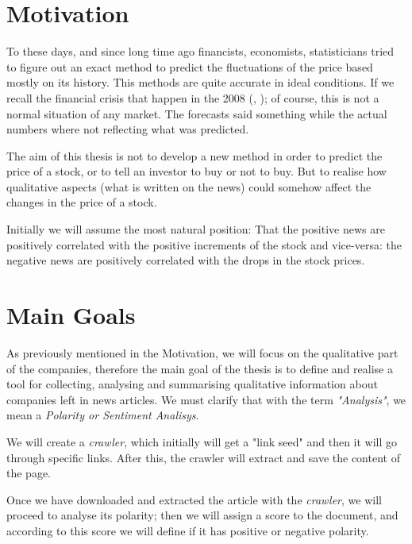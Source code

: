 	\section{Motivation}
	
	To these days, and since long time ago financists, economists, statisticians tried to figure out an exact method 
	to predict the fluctuations of the price based mostly on its history. This methods are quite accurate in ideal
	conditions. If we recall the financial crisis that happen in the 2008 (\cite{P2009}, \cite{R2010}); of course, this is not a normal situation of any 
	market. The forecasts said something while the actual numbers where not reflecting what was predicted. 
	
	The aim of this thesis is not to develop a new method in order to predict the price of a stock, or to tell an investor to buy
	or not to buy. But to realise how qualitative aspects (what is written on the news) could somehow affect the changes in the price of a stock.
	
	Initially we will assume the most natural position: That the positive news are positively correlated with the 
	positive increments of the stock and vice-versa: the negative news are positively correlated with the drops
	in the stock prices.
	
	\clearpage
	\section{Main Goals}
	
	As previously mentioned in the Motivation, we will focus on the qualitative part of the companies, therefore the main goal of the thesis is to define and realise a tool for collecting, analysing and summarising qualitative information about companies left in news articles. 
	We must clarify that with the term \emph{"Analysis"}, we mean a \emph{Polarity or Sentiment Analisys}.
	
	We will create a \emph{crawler}, which initially will get a "link seed" and then it will go through specific links. After this, the crawler will extract and save the content of the page.
	
	Once we have downloaded and extracted the article with the \emph{crawler}, we will proceed to analyse its polarity; then we will assign a score to the document, and according to this score we will define if it has positive or negative polarity.


